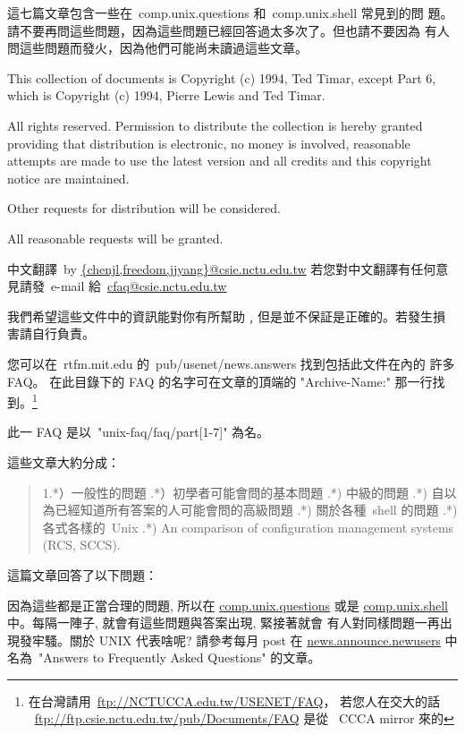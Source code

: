 \documentclass{article}
\begin{document}
\begin{CJK*}{Bg5}{ming}
這七篇文章包含一些在~comp.unix.questions 和~comp.unix.shell 常見到的問
題。請不要再問這些問題，因為這些問題已經回答過太多次了。但也請不要因為
有人問這些問題而發火，因為他們可能尚未讀過這些文章。

This collection of documents is Copyright (c) 1994, Ted Timar, except 
Part 6, which is Copyright (c) 1994, Pierre Lewis and Ted Timar.

All rights reserved. Permission to distribute the collection is 
hereby granted providing that distribution is electronic, no money is 
involved, reasonable attempts are made to use the latest version and 
all credits and this copyright notice are maintained.

Other requests for distribution will be considered.

All reasonable requests will be granted.

中文翻譯~by \url{{chenjl,freedom,jjyang}@csie.nctu.edu.tw}
若您對中文翻譯有任何意見請發~e-mail 給~\url{cfaq@csie.nctu.edu.tw}

我們希望這些文件中的資訊能對你有所幫助﹐但是並不保証是正確的。若發生損
害請自行負責。

您可以在~rtfm.mit.edu 的~pub/usenet/news.answers 找到包括此文件在內的
許多 FAQ。 在此目錄下的 FAQ 的名字可在文章的頂端的 "Archive-Name:" 
那一行找到。\footnote{ 在台灣請用~\url{ftp://NCTUCCA.edu.tw/USENET/FAQ}，
若您人在交大的話 ~\url{ftp://ftp.csie.nctu.edu.tw/pub/Documents/FAQ} 是從
~CCCA mirror  來的}

此一 FAQ 是以~"unix-faq/faq/part[1-7]" 為名。

這些文章大約分成：
\begin{quote} 
      1.*）一般性的問題 .*）初學者可能會問的基本問題 .*) 中級的問題 .*) 自以為已經知道所有答案的人可能會問的高級問題 .*) 關於各種~shell 的問題 .*) 各式各樣的~Unix .*) An comparison of configuration management systems (RCS, SCCS).
\end{quote}
這篇文章回答了以下問題：
\setcounter{section}{1}
\tableofcontents

因為這些都是正當合理的問題, 所以在 \url{comp.unix.questions} 或是 
\url{comp.unix.shell} 中。每隔一陣子, 就會有這些問題與答案出現, 緊接著就會
有人對同樣問題一再出現發牢騷。關於 UNIX 代表啥呢? 請參考每月 post 在 
\url{news.announce.newusers} 中名為~"Answers to Frequently Asked Questions" 
的文章。


\end{CJK*}
\end{document}

